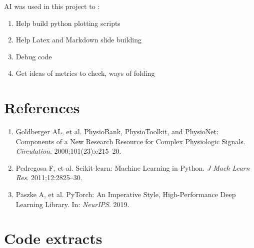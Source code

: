 \documentclass[11pt,a4paper]{article}
\begin{document}
AI was used in this project to :

  \begin{enumerate}
   \item Help build python plotting scripts
  \item Help Latex and Markdown slide building
  \item Debug code
  \item Get ideas of metrics to check, ways of folding
  \end{enumerate}

\newpage
\section*{References}
  \begin{enumerate}
   \item Goldberger AL, et al. PhysioBank, PhysioToolkit, and PhysioNet: Components of a New Research Resource for Complex Physiologic Signals. \textit{Circulation}. 2000;101(23):e215--20.
   \item Pedregosa F, et al. Scikit-learn: Machine Learning in Python. \textit{J Mach Learn Res}. 2011;12:2825--30.
   \item Paszke A, et al. PyTorch: An Imperative Style, High-Performance Deep Learning Library. In: \textit{NeurIPS}. 2019.
  \end{enumerate}

\appendix

\section{Code extracts}
\label{app:code}
\end{document}
